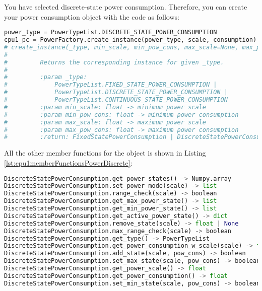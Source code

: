 \documentclass[]{scrartcl}
\begin{document}
You have selected discrete-state power consumption. Therefore, you can create your power consumption object with the code as follows:

\begin{lstlisting}[language=Python, frame=single, label={lst:cpu1settingPowerConsumptionDiscrete}, caption={Power consumption object is created for Discrete-State Power Consumption type.}]
power_type = PowerTypeList.DISCRETE_STATE_POWER_CONSUMPTION
cpu1_pc = PowerFactory.create_instance(power_type, scale, consumption)
# create_instance(_type, min_scale, min_pow_cons, max_scale=None, max_pow_cons=None) -> FixedStatePowerConsumption | DiscreteStatePowerConsumption | ContinuousStatePowerConsumption
# 
#         Returns the corresponding instance for given _type.
# 
#         :param _type:
#             PowerTypeList.FIXED_STATE_POWER_CONSUMPTION |
#             PowerTypeList.DISCRETE_STATE_POWER_CONSUMPTION |
#             PowerTypeList.CONTINUOUS_STATE_POWER_CONSUMPTION
#         :param min_scale: float -> minimum power scale
#         :param min_pow_cons: float -> minimum power consumption
#         :param max_scale: float -> maximum power scale
#         :param max_pow_cons: float -> maximum power consumption
#         :return: FixedStatePowerConsumption | DiscreteStatePowerConsumption | ContinuousStatePowerConsumption
\end{lstlisting}
        
       
All the other member functions for the object is shown in Listing \ref{lst:cpu1memberFunctionsPowerDiscrete}:
            

\begin{lstlisting}[language=Python, frame=single, label={lst:cpu1memberFunctionsPowerDiscrete}, caption={The member functions for \textsf{DiscreteStatePowerConsumption} module.}]
DiscreteStatePowerConsumption.get_power_states() -> Numpy.array
DiscreteStatePowerConsumption.set_power_mode(scale) -> list
DiscreteStatePowerConsumption.range_check(scale) -> boolean
DiscreteStatePowerConsumption.get_max_power_state() -> list
DiscreteStatePowerConsumption.get_min_power_state() -> list
DiscreteStatePowerConsumption.get_active_power_state() -> dict
DiscreteStatePowerConsumption.remove_state(scale) -> float | None
DiscreteStatePowerConsumption.max_range_check(scale) -> boolean
DiscreteStatePowerConsumption.get_type() -> PowerTypeList
DiscreteStatePowerConsumption.get_power_consumption_w_scale(scale) -> float
DiscreteStatePowerConsumption.add_state(scale, pow_cons) -> boolean
DiscreteStatePowerConsumption.set_max_state(scale, pow_cons) -> boolean
DiscreteStatePowerConsumption.get_power_scale() -> float
DiscreteStatePowerConsumption.get_power_consumption() -> float
DiscreteStatePowerConsumption.set_min_state(scale, pow_cons) -> boolean
\end{lstlisting}
        
\end{document}
